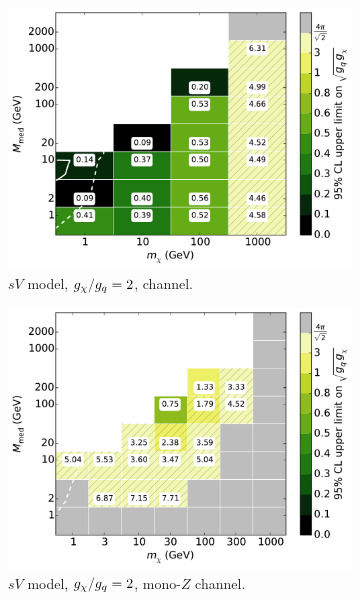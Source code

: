 \begin{figure}
  \centering
  \begin{subfigure}[t]{0.32\textwidth}
    \centering
    \includegraphics[width=1.\textwidth]{figures/grid_basepoints_SVD_rat2_monojet.pdf}
    \caption{$sV$ model, $g_{\chi}/g_q = 2$, \monojet channel.}
  \end{subfigure}
  \begin{subfigure}[t]{0.32\textwidth}
    \centering
    \includegraphics[width=1.\textwidth]{figures/grid_allpoints_SVD_rat2.pdf}
    \caption{$sV$ model, $g_{\chi}/g_q = 2$, mono-$Z$ channel.}
  \end{subfigure}
  \begin{subfigure}[t]{0.32\textwidth}

\end{subfigure}
\end{figure}
